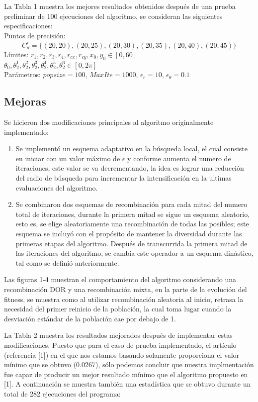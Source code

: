 \documentclass[10pt,journal,compsoc]{styles/IEEEtran}
\begin{document}
La Tabla 1 muestra los mejores resultados obtenidos después de una prueba preliminar de 100 ejecuciones del algoritmo, se consideran las siguientes especificaciones:\\ 

 Puntos de precisi\'on: 
 $$C_d^i=\{(20,20),(20,25),(20,30),(20,35),(20,40),(20,45)\}$$
 L\'imites: $r_1,r_2,r_3,r_4,r_{cx},r_{cy},x_0,y_0 \in [0,60]$\\
 $\theta_0,\theta_2^1,\theta_2^2,\theta_2^3,\theta_2^4,\theta_2^5,\theta_2^6 \in [0,2\pi]$\\
 Par\'ametros:
 $popsize=100$, $MaxIte=1000$, $\epsilon_r=10$, $\epsilon_{\theta}=0.1$\\
 
\subsection{Mejoras}

Se hicieron dos modificaciones principales al algoritmo originalmente implementado:

\begin{enumerate}
	\item Se implement\'o un esquema adaptativo en la búsqueda local, el cual consiste en iniciar con un valor máximo de $\epsilon$ y conforme aumenta el numero de iteraciones, este valor se va decrementando, la idea es lograr una reducción del radio de búsqueda para incrementar la intensificación en la ultimas evaluaciones del algoritmo.
	\item Se combinaron dos esquemas de recombinaci\'on para cada mitad del numero total de iteraciones, durante la primera mitad se sigue un esquema aleatorio, esto es, se elige aleatoriamente una recombinaci\'on de todas las posibles; este esquema se incluy\'o con el propósito de mantener la diversidad durante las primeras etapas del algoritmo. Después de transcurrida la primera mitad de las iteraciones del algoritmo, se cambia este operador a un esquema dinástico, tal como se definió anteriormente.
\end{enumerate}

Las figuras 1-4 muestran el comportamiento del algoritmo considerando una recombinaci\'on DOR y una recombinaci\'on mixta, en la parte de la evolución del fitness, se muestra como al utilizar recombinaci\'on aleatoria al inicio, retrasa la necesidad del primer reinicio de la poblaci\'on, la cual toma lugar cuando la desviación estándar de la población cae por debajo de 1.


La Tabla 2 muestra los resultados mejorados después de implementar estas modificaciones. Puesto que para el caso de prueba implementado, el art\'iculo (referencia [1]) en el que nos estamos basando solamente proporciona el valor mínimo que se obtuvo (0.0267), s\'olo podemos concluir que nuestra implmentaci\'on fue capaz de producir un mejor resultado mínimo que el algoritmo propuesto en [1]. A continuaci\'on se muestra tambi\'en una estad\'istica que se obtuvo durante un total de 282 ejecuciones del programa:
\end{document}
